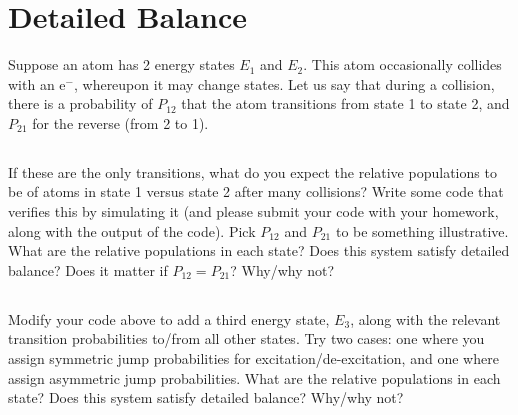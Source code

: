 \documentclass[11pt]{article}
\begin{document}
\section{Detailed Balance}

Suppose an atom has 2 energy states $E_1$ and $E_2$.  This atom occasionally
collides with an e$^-$, whereupon it may change states.  Let us say that
during a collision, there is a probability of $P_{12}$ that the atom transitions
from state 1 to state 2, and $P_{21}$ for the reverse (from 2 to 1).

\subsection{}
If these are the only transitions, what do you expect the relative populations
to be of atoms in state 1 versus state 2 after many collisions?  Write some
code that verifies this by simulating it (and please submit your code with your homework,
along with the output of the code).  Pick $P_{12}$ and $P_{21}$ to be something
illustrative.  What are the relative populations in each state?
Does this system satisfy detailed balance?  Does it matter if $P_{12}=P_{21}$?
Why/why not?

\subsection{}
Modify your code above to add a third energy state, $E_3$, along with the relevant
transition probabilities to/from all other states.  Try two cases: one
where you assign symmetric jump probabilities for excitation/de-excitation,
and one where assign asymmetric jump probabilities.
What are the relative
populations in each state?
Does this system satisfy detailed balance?  Why/why not?
\end{document}
